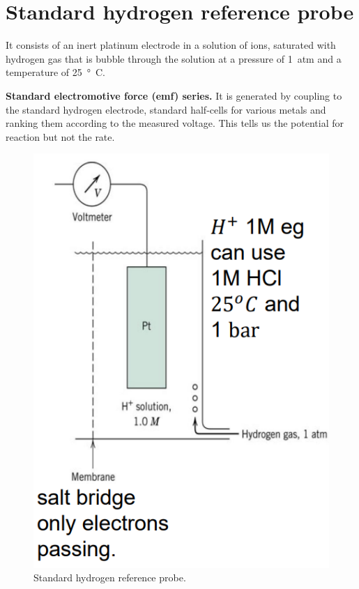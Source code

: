 \section{Standard hydrogen reference probe}
It consists of an inert platinum electrode in a  solution of  ions, saturated with hydrogen gas that is bubble through the solution at a pressure of \SI{1}{atm} and a temperature of \SI{25}{\degree C}.

\textbf{Standard electromotive force (emf) series.} It is generated by coupling to the standard hydrogen electrode, standard half-cells for various metals and ranking them according to the measured voltage. This tells us the potential for reaction but not the rate.
\begin{figure}[H]
    \centering
    \includegraphics[width = 0.5 \textwidth]{img/figure72.png}
    \caption{Standard hydrogen reference probe.}
\end{figure}
